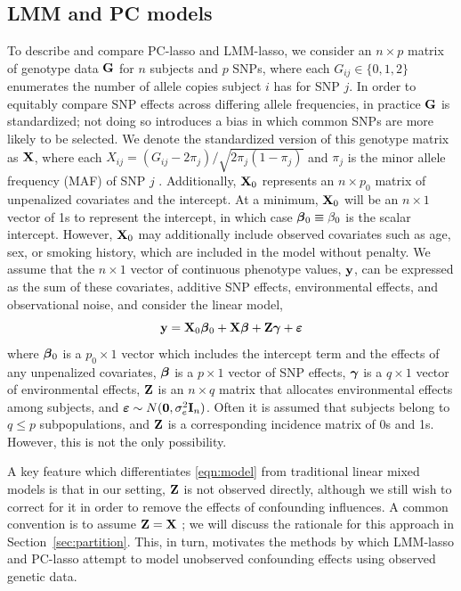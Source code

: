 \subsection{LMM and PC models}
\label{sec:lmm-and-pc}

To describe and compare PC-lasso and LMM-lasso, we consider an $n \times p$ matrix of genotype data $\mathbf{G}$ for $n$ subjects and $p$ SNPs, where each $G_{ij} \in \{ 0, 1, 2 \}$ enumerates the number of allele copies subject $i$ has for SNP $j$. In order to equitably compare SNP effects across differing allele frequencies, in practice $\mathbf{G}$ is standardized; not doing so introduces a bias in which common SNPs are more likely to be selected. We denote the standardized version of this genotype matrix as $\mathbf{X}$, where each $X_{ij} = (G_{ij} - 2 \pi_j) / \sqrt{2\pi_j (1 - \pi_j)}$ and $\pi_j$ is the minor allele frequency (MAF) of SNP $j$ \citep{zhang2015principal, price2006principal}. Additionally, $\mathbf{X}_0$ represents an $n \times p_0$ matrix of unpenalized covariates and the intercept. At a minimum, $\mathbf{X}_0$ will be an $n \times 1$ vector of 1s to represent the intercept, in which case $\boldsymbol{\beta}{}_0 \equiv \beta_0$ is the scalar intercept. However, $\mathbf{X}_0$ may additionally include observed covariates such as age, sex, or smoking history, which are included in the model without penalty. We assume that the $n \times 1$ vector of continuous phenotype values, $\mathbf{y}$, can be expressed as the sum of these covariates, additive SNP effects, environmental effects, and observational noise, and consider the linear model,
\begin{equation}
    \label{eqn:model}
    \mathbf{y} = \mathbf{X}_0 \boldsymbol{\beta}{}_0 + \mathbf{X}\boldsymbol{\beta}{} + \mathbf{Z}\boldsymbol{\gamma} + \boldsymbol{\varepsilon}{}
\end{equation}
where $\boldsymbol{\beta}{}_0$ is a $p_0 \times 1$ vector which includes the intercept term and the effects of any unpenalized covariates, $\boldsymbol{\beta}{}$ is a $p \times 1$ vector of SNP effects, $\boldsymbol{\gamma}$ is a $q \times 1$ vector of environmental effects, $\mathbf{Z}$ is an $n \times q$ matrix that allocates environmental effects among subjects, and $\boldsymbol{\varepsilon}{} \sim N(\boldsymbol{0}, \sigma^2_e \mathbf{I}_n)$. Often it is assumed that subjects belong to $q \le p$ subpopulations, and $\mathbf{Z}$ is a corresponding incidence matrix of 0s and 1s. However, this is not the only possibility.

A key feature which differentiates \eqref{eqn:model} from traditional linear mixed models is that in our setting, $\mathbf{Z}$ is not observed directly, although we still wish to correct for it in order to remove the effects of confounding influences. A common convention is to assume $\mathbf{Z} = \mathbf{X}$ \citep{wang2018multiplex, lippert2011fast, yang2014advantages}; we will discuss the rationale for this approach in Section~\ref{sec:partition}.  This, in turn, motivates the methods by which LMM-lasso and PC-lasso attempt to model unobserved confounding effects using observed genetic data.

